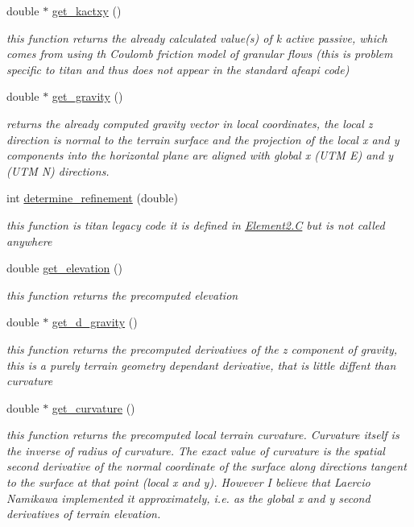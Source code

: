 \begin{CompactItemize}
double $\ast$ \hyperlink{classElement_a86}{get\_\-kactxy} ()
\begin{CompactList}\small\item\em this function returns the already calculated value(s) of k active passive, which comes from using th Coulomb friction model of granular flows (this is problem specific to titan and thus does not appear in the standard afeapi code) \item\end{CompactList}\item 
double $\ast$ \hyperlink{classElement_a87}{get\_\-gravity} ()
\begin{CompactList}\small\item\em returns the already computed gravity vector in local coordinates, the local z direction is normal to the terrain surface and the projection of the local x and y components into the horizontal plane are aligned with global x (UTM E) and y (UTM N) directions. \item\end{CompactList}\item 
int \hyperlink{classElement_a88}{determine\_\-refinement} (double)
\begin{CompactList}\small\item\em this function is titan legacy code it is defined in \hyperlink{constant_8h_a21}{Element2.C} but is not called anywhere \item\end{CompactList}\item 
double \hyperlink{classElement_a89}{get\_\-elevation} ()
\begin{CompactList}\small\item\em this function returns the precomputed elevation \item\end{CompactList}\item 
double $\ast$ \hyperlink{classElement_a90}{get\_\-d\_\-gravity} ()
\begin{CompactList}\small\item\em this function returns the precomputed derivatives of the z component of gravity, this is a purely terrain geometry dependant derivative, that is little diffent than curvature \item\end{CompactList}\item 
double $\ast$ \hyperlink{classElement_a91}{get\_\-curvature} ()
\begin{CompactList}\small\item\em this function returns the precomputed local terrain curvature. Curvature itself is the inverse of radius of curvature. The exact value of curvature is the spatial second derivative of the normal coordinate of the surface along directions tangent to the surface at that point (local x and y). However I believe that Laercio Namikawa implemented it approximately, i.e. as the global x and y second derivatives of terrain elevation. \item\end{CompactList}\item 

\end{CompactItemize}
